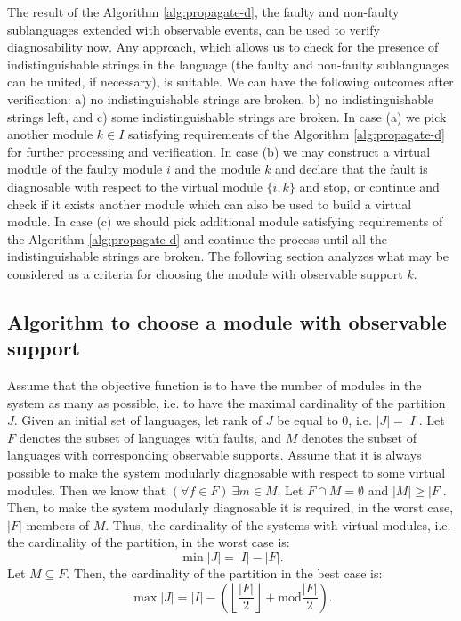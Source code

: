 The result of the Algorithm \ref{alg:propagate-d}, the faulty and non-faulty
sublanguages extended with observable events, can be used to verify
diagnosability now. Any approach, which allows us to check for the presence of
indistinguishable strings in the language (the faulty and non-faulty
sublanguages can be united, if necessary), is suitable. We can have the
following outcomes after verification: a) no indistinguishable strings are
broken, b) no indistinguishable strings left, and c) some indistinguishable
strings are broken. In case (a) we pick another module $k \in I$ satisfying
requirements of the Algorithm \ref{alg:propagate-d} for further processing and
verification. In case (b) we may construct a virtual module of the faulty module
$i$ and the module $k$ and declare that the fault is diagnosable with respect to
the virtual module $\{i, k\}$ and stop, or continue and check if it exists
another module which can also be used to build a virtual module. In case (c) we should
pick additional module satisfying requirements of the Algorithm
\ref{alg:propagate-d} and continue the process until all the indistinguishable
strings are broken. The following section analyzes what may be considered as a
criteria for choosing the module with observable support $k$.


\subsection{Algorithm to choose a module with observable support}
Assume that the objective function is to have the number of modules in the
system as many as possible, i.e. to have the maximal cardinality of the
partition $J$.
Given an initial set of languages, let rank of $J$ be equal to 0, i.e. $|J| =
|I|$. Let $F$ denotes the subset of languages with faults, and $M$ denotes the
subset of languages with corresponding observable supports.
Assume that it is always possible to make the system modularly diagnosable with
respect to some virtual modules. Then we know that $(\forall f \in F)~\exists m
\in M$. Let $F \cap M = \emptyset$ and $|M| \geq |F|$. Then, to make the system
modularly diagnosable it is required, in the worst case, $|F|$ members of $M$.
Thus, the cardinality of the systems with virtual modules, i.e. the cardinality
of the partition, in the worst case is:
\begin{equation}
	\min |J| = |I| - |F|.
\end{equation}
Let $M \subseteq F$. Then, the cardinality of the partition in the best case
is:
\begin{equation}
	\max |J| = |I| - \left(
		\left\lfloor \frac{|F|}{2} \right\rfloor + \textrm{mod} \frac{|F|}{2}
		\right). 
\end{equation}


